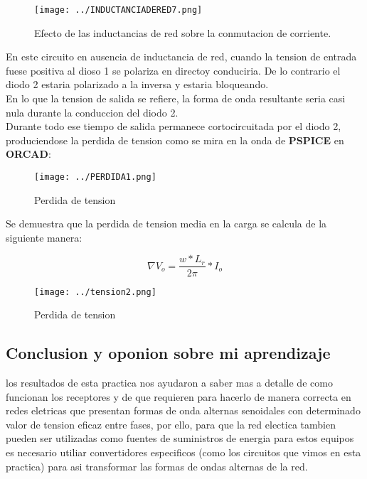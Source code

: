\documentclass[11pt,a4paper]{article}
\begin{document}
\begin{figure}[h]
\centering
\texttt{[image: ../INDUCTANCIADERED7.png]} 
\caption{Efecto de las inductancias de red sobre la conmutacion de corriente.}
\end{figure}

En este circuito en ausencia de inductancia de red, cuando la tension de entrada fuese positiva al dioso 1 se polariza en directoy conduciria. De lo contrario el diodo 2 estaria polarizado a la inversa y estaria bloqueando.\\
En lo que la tension de salida se refiere, la forma de onda resultante seria casi nula durante la conduccion del diodo 2.\\
Durante todo ese tiempo de salida permanece cortocircuitada por el diodo 2, produciendose la perdida de tension como se mira en la onda de \textbf{PSPICE} en \textbf{ORCAD}:

\begin{figure}[h]
\centering
\texttt{[image: ../PERDIDA1.png]} 
\caption{Perdida de tension}
\end{figure}

Se demuestra que la perdida de tension media en la carga se calcula de la siguiente manera:

$$ \nabla V_{o} = \dfrac{w*L_{r}}{2\pi} * I_{o} $$

\begin{figure}[h]
\centering
\texttt{[image: ../tension2.png]} 
\caption{Perdida de tension}
\end{figure}

\begin{center}
\section{Conclusion y oponion sobre mi aprendizaje}
los resultados de esta practica nos ayudaron a saber mas a detalle de como funcionan los receptores y de que requieren para hacerlo de manera correcta en redes eletricas que presentan formas de onda alternas senoidales con determinado valor de tension eficaz entre fases, por ello, para que la red electica tambien pueden ser utilizadas como fuentes de suministros de energia para estos equipos es necesario utiliar convertidores especificos (como los circuitos que vimos en esta practica) para asi transformar las formas de ondas alternas de la red. 
\end{center}
\end{document}
